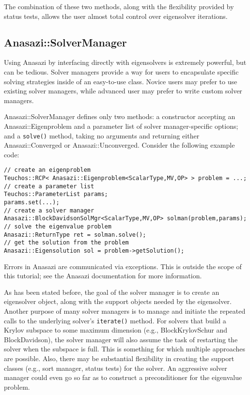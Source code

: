 The combination of these two methods, along with the flexibility provided by status tests,
allows the user almost total control over eigensolver iterations.


\subsection{Anasazi::SolverManager}
\label{sec:anasazi:solvermanager}

Using Anasazi by interfacing directly with eigensolvers is extremely powerful, but can be
tedious. Solver managers provide a way for users to encapsulate specific solving
strategies inside of an easy-to-use class. Novice users may prefer to use existing solver
managers, while advanced user may prefer to write custom solver managers.

Anasazi::SolverManager defines only two methods: a constructor accepting an
Anasazi::\-Eigenproblem and a parameter list of solver manager-specific options; and a
\verb!solve()! method, taking no arguments and returning 
either Anasazi::Converged or Anasazi::Unconverged.
Consider the following example code:
\begin{verbatim}
// create an eigenproblem
Teuchos::RCP< Anasazi::Eigenproblem<ScalarType,MV,OP> > problem = ...;
// create a parameter list
Teuchos::ParameterList params;
params.set(...);
// create a solver manager
Anasazi::BlockDavidsonSolMgr<ScalarType,MV,OP> solman(problem,params);
// solve the eigenvalue problem
Anasazi::ReturnType ret = solman.solve();
// get the solution from the problem
Anasazi::Eigensolution sol = problem->getSolution();
\end{verbatim}

\begin{remark}
  Errors in Anasazi are communicated via exceptions. This is outside the scope of this
  tutorial; see the Anasazi documentation for more information.
\end{remark}

As has been stated before, the goal of the solver manager is to create an eigensolver
object, along with the support objects needed by the eigensolver. Another purpose of many
solver managers is to manage and initiate the repeated calls to the underlying solver's
\verb!iterate()! method. For solvers that build a Krylov subspace to some maximum
dimension (e.g., BlockKrylovSchur and BlockDavidson), the solver manager will also assume
the task of restarting the solver when the subspace is full. This is something for which
multiple approaches are possible. Also, there may be substantial flexibility in creating
the support classes (e.g., sort manager, status tests) for the solver. An aggressive
solver manager could even go so far as to construct a preconditioner for the eigenvalue
problem. 

